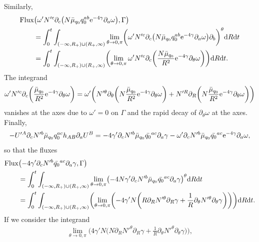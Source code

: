 \documentclass[pdftex]{sigma}
\def\ptl{\partial}%
\numberwithin{equation}{section}
\begin{document}
Similarly,
\begin{align*}
& {\rm Flux} \bigl(\omega' N'^c \ptl_c \bigl(N \bar{\mu}_{q_0} q^{ab}_0 {\rm e}^{-4\gamma} \ptl_a \omega\bigr), \Gamma\bigr) \notag\\
&{}\qquad{}=
\int^t_0 \int_{ (-\infty, R_+) \cup (R_+, \infty) } \lim_{\theta \to 0, \pi} \biggl( \omega' N'^c \ptl_c \bigl(N \bar{\mu}_{q_0} q^{ab}_0 {\rm e}^{-4\gamma} \ptl_a \omega\bigr) \ptl_b \biggr)^\theta {\rm d}R {\rm d}t \\
&{}\qquad{}= \int^t_0 \int_{ (-\infty, R_+) \cup (R_+, \infty) } \biggl( \lim_{\theta \to 0, \pi} \omega' N'^c \ptl_c \biggl(\frac{N \bar{\mu}_{q_0}}{R^2} {\rm e}^{-4\gamma} \ptl_\theta \omega\biggr) \biggr) {\rm d}R {\rm d}t.
\end{align*}
The integrand
\begin{align*}
 \omega' N'^c \ptl_c \biggl(\frac{\bar{\mu}_{q_0}}{R^2} {\rm e}^{-4\gamma} \ptl_\theta \omega\biggr)= \omega' \biggl(N'^\theta \ptl_\theta \biggl(N \frac{\bar{\mu}_{q_0}}{R^2} {\rm e}^{-4\gamma} \ptl_\theta \omega\biggr) + N'^ R \ptl_R \biggl(N \frac{\bar{\mu}_{q_0}}{R^2} {\rm e}^{-4\gamma} \ptl_\theta \omega\biggr)\biggr)
\end{align*}
vanishes at the axes due to $\omega' =0$ on $\Gamma$ and the rapid decay of $\ptl_\theta \omega$ at the axes.
Finally,
\begin{align*}
-U'^A \ptl_c N'^b \bar{\mu}_{q_0} q^{ac}_0 h_{AB} \ptl_a U^B = -4\gamma' \ptl_c N'^b \bar{\mu}_{q_0} \bar{q_0}^{ac} \ptl_a \gamma
-\omega' \ptl_c N'^b \bar{\mu}_{q_0} \bar{q_0}^{ac} {\rm e}^{-4\gamma} \ptl_a \omega,
\end{align*}
so that the fluxes
\begin{align*}
& {\rm Flux} \bigl(-4\gamma' \ptl_c N'^b \bar{q_0}^{ac} \ptl_a \gamma, \Gamma\bigr) \notag\\
&\qquad{}= \int^t_0 \int_{ (-\infty, R_+) \cup (R_+, \infty) } \lim_{\theta \to 0, \pi} \bigl( -4N \gamma' \ptl_c N'^b \bar{\mu}_{q_0} \bar{q_0}^{ac} \ptl_a \gamma \bigr)^\theta {\rm d}R {\rm d}t \notag\\
&\qquad{}= \int^t_0 \int_{ (-\infty, R_+) \cup (R_+, \infty) }\biggl(\lim_{\theta \to 0, \pi} \biggl(-4 \gamma' N \biggl(R \ptl_R N'^\theta \ptl_R \gamma + \frac{1}{R} \ptl_\theta N'^\theta \ptl_\theta \gamma\biggr)\biggr) \biggr) {\rm d}R {\rm d}t.
\end{align*}
If we consider the integrand
\begin{align*}
\lim_{\theta \to 0, \pi} \biggl(4 \gamma' N \biggl(N\ptl_R N'^\theta \ptl_R \gamma + \frac{1}{R} \ptl_\theta N'^\theta \ptl_\theta \gamma\biggr)\biggr),
\end{align*}
\end{document}
